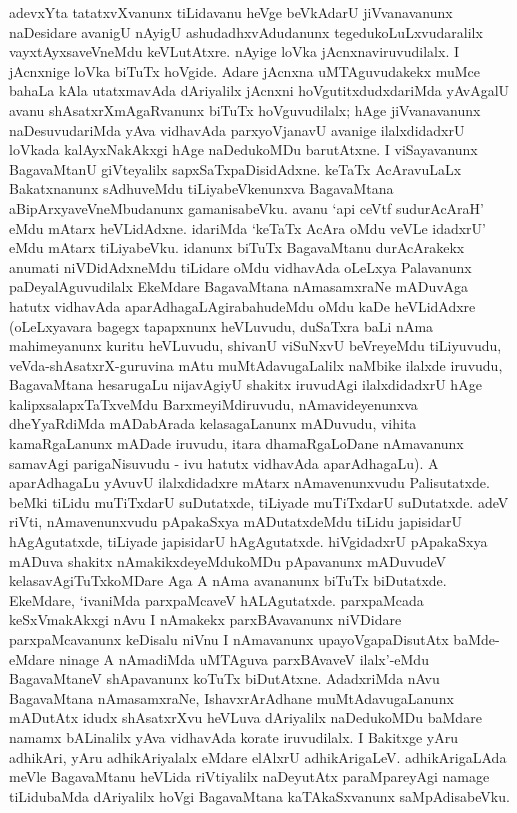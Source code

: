 adevxYta tatatxvXvanunx tiLidavanu heVge beVkAdarU jiVvanavanunx naDesidare avanigU nAyigU ashudadhxvAdudanunx tegedukoLuLxvudaralilx vayxtAyxsaveVneMdu keVLutAtxre. nAyige loVka jAcnxnaviruvudilalx. I jAcnxnige loVka biTuTx hoVgide. Adare jAcnxna uMTAguvudakekx muMce bahaLa kAla utatxmavAda dAriyalilx jAcnxni hoVgutitxdudxdariMda yAvAgalU avanu shAsatxrXmAgaRvanunx biTuTx hoVguvudilalx; hAge jiVvanavanunx naDesuvudariMda yAva vidhavAda parxyoVjanavU avanige ilalxdidadxrU loVkada kalAyxNakAkxgi hAge naDedukoMDu barutAtxne. I viSayavanunx BagavaMtanU giVteyalilx sapxSaTxpaDisidAdxne. keTaTx AcAravuLaLx Bakatxnanunx sAdhuveMdu tiLiyabeVkenunxva BagavaMtana aBipArxyaveVneMbudanunx gamanisabeVku. avanu `api ceVtf sudurAcAraH' eMdu mAtarx heVLidAdxne. idariMda `keTaTx AcAra oMdu veVLe idadxrU' eMdu mAtarx tiLiyabeVku. idanunx biTuTx BagavaMtanu durAcArakekx anumati niVDidAdxneMdu tiLidare oMdu vidhavAda oLeLxya Palavanunx paDeyalAguvudilalx EkeMdare BagavaMtana nAmasamxraNe mADuvAga hatutx vidhavAda aparAdhagaLAgirabahudeMdu oMdu kaDe heVLidAdxre (oLeLxyavara bagegx tapapxnunx heVLuvudu, duSaTxra baLi nAma mahimeyanunx kuritu heVLuvudu, shivanU viSuNxvU beVreyeMdu tiLiyuvudu, veVda-shAsatxrX-guruvina mAtu muMtAdavugaLalilx naMbike ilalxde iruvudu, BagavaMtana hesarugaLu nijavAgiyU shakitx iruvudAgi ilalxdidadxrU hAge kalipxsalapxTaTxveMdu BarxmeyiMdiruvudu, nAmavideyenunxva dheYyaRdiMda mADabArada kelasagaLanunx mADuvudu, vihita kamaRgaLanunx mADade iruvudu, itara dhamaRgaLoDane nAmavanunx samavAgi parigaNisuvudu - ivu hatutx vidhavAda aparAdhagaLu). A aparAdhagaLu yAvuvU ilalxdidadxre mAtarx nAmavenunxvudu Palisutatxde. beMki tiLidu muTiTxdarU suDutatxde, tiLiyade muTiTxdarU suDutatxde. adeV riVti, nAmavenunxvudu pApakaSxya mADutatxdeMdu tiLidu japisidarU hAgAgutatxde, tiLiyade japisidarU hAgAgutatxde. hiVgidadxrU pApakaSxya mADuva shakitx nAmakikxdeyeMdukoMDu pApavanunx mADuvudeV kelasavAgiTuTxkoMDare Aga A nAma avananunx biTuTx biDutatxde. EkeMdare, `ivaniMda parxpaMcaveV hALAgutatxde. parxpaMcada keSxVmakAkxgi nAvu I nAmakekx parxBAvavanunx niVDidare parxpaMcavanunx keDisalu niVnu I nAmavanunx upayoVgapaDisutAtx baMde-eMdare ninage A nAmadiMda uMTAguva parxBAvaveV ilalx'-eMdu BagavaMtaneV shApavanunx koTuTx biDutAtxne. AdadxriMda nAvu BagavaMtana nAmasamxraNe, IshavxrArAdhane muMtAdavugaLanunx mADutAtx idudx shAsatxrXvu heVLuva dAriyalilx naDedukoMDu baMdare namamx bALinalilx yAva vidhavAda korate iruvudilalx. I Bakitxge yAru adhikAri, yAru adhikAriyalalx eMdare elAlxrU adhikArigaLeV. adhikArigaLAda meVle BagavaMtanu heVLida riVtiyalilx naDeyutAtx paraMpareyAgi namage tiLidubaMda dAriyalilx hoVgi BagavaMtana kaTAkaSxvanunx saMpAdisabeVku.





\endchapter
